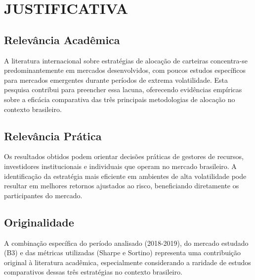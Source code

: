 \section{JUSTIFICATIVA}

\subsection{Relevância Acadêmica}

A literatura internacional sobre estratégias de alocação de carteiras concentra-se predominantemente em mercados desenvolvidos, com poucos estudos específicos para mercados emergentes durante períodos de extrema volatilidade. Esta pesquisa contribui para preencher essa lacuna, oferecendo evidências empíricas sobre a eficácia comparativa das três principais metodologias de alocação no contexto brasileiro.

\subsection{Relevância Prática}

Os resultados obtidos podem orientar decisões práticas de gestores de recursos, investidores institucionais e individuais que operam no mercado brasileiro. A identificação da estratégia mais eficiente em ambientes de alta volatilidade pode resultar em melhores retornos ajustados ao risco, beneficiando diretamente os participantes do mercado.

\subsection{Originalidade}

A combinação específica do período analisado (2018-2019), do mercado estudado (B3) e das métricas utilizadas (Sharpe e Sortino) representa uma contribuição original à literatura acadêmica, especialmente considerando a raridade de estudos comparativos dessas três estratégias no contexto brasileiro.